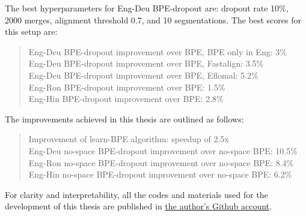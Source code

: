 The best hyperparameters for Eng-Deu BPE-dropout are: dropout rate 10\%, 2000 merges, alignment threshold 0.7, and 10 segmentations. The best scores for this setup are:

\begin{quote}
    Eng-Deu BPE-dropout improvement over BPE, BPE only in Eng: 3\%\\
    Eng-Deu BPE-dropout improvement over BPE, Fastalign: 3.5\%\\
    Eng-Deu BPE-dropout improvement over BPE, Eflomal: 5.2\%\\
    Eng-Ron BPE-dropout improvement over BPE: 1.5\%\\
    Eng-Hin BPE-dropout improvement over BPE: 2.8\%
\end{quote}

The improvements achieved in this thesis are outlined as follows:

\begin{quote}
    Improvement of learn-BPE algorithm: speedup of 2.5x\\
    Eng-Deu no-space BPE-dropout improvement over no-space BPE: 10.5\%\\
    Eng-Ron no-space BPE-dropout improvement over no-space BPE: 8.4\%\\
    Eng-Hin no-space BPE-dropout improvement over no-space BPE: 6.2\%
\end{quote}

For clarity and interpretability, all the codes and materials used for the development of this thesis are published in \href{https://github.com/anebz/thesis/}{the author's Github account}.
